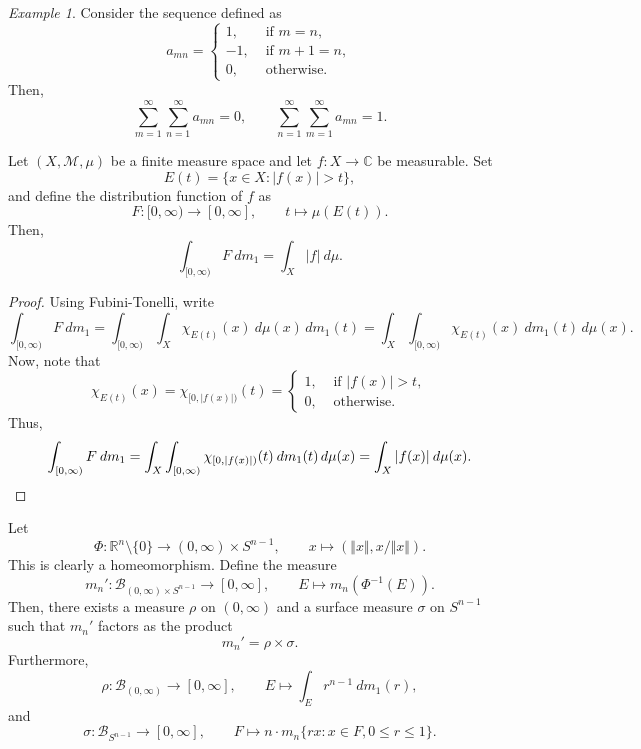 \documentclass[11pt]{article}
\newcommand{\C}{\mathbb{C}}
\newcommand{\R}{\mathbb{R}}
\newcommand{\M}{\mathcal{M}}
\newcommand{\norm}[1]{\Vert #1 \Vert}
\theoremstyle{definition}
\theoremstyle{remark}
\newtheorem*{example}{Example}
\numberwithin{equation}{section}
\begin{document}
    \begin{example}
        Consider the sequence defined as \[
            a_{mn} = \begin{cases}
                1, &\text{ if } m = n, \\
                -1, &\text{ if } m + 1 = n, \\
                0, &\text{ otherwise}.
            \end{cases}
        \] Then, \[
            \sum_{m = 1}^\infty\sum_{n = 1}^\infty a_{mn} = 0, \qquad
            \sum_{n = 1}^\infty\sum_{m = 1}^\infty a_{mn} = 1.
        \] 
    \end{example}


    \begin{theorem}
        Let $(X, \M, \mu)$ be a finite measure space and let $f\colon X \to \C$ be
        measurable. Set \[
            E(t) = \{x \in X: |f(x)| > t\},
        \] and define the distribution function of $f$ as \[
            F\colon [0, \infty) \to [0, \infty], \qquad t \mapsto \mu(E(t)).
        \] Then, \[
            \int_{[0, \infty)} F\:dm_1 = \int_X |f|\:d\mu.
        \] 
    \end{theorem}
    \begin{proof}
        Using Fubini-Tonelli, write \[
            \int_{[0, \infty)} F\:dm_1 = \int_{[0, \infty)} \int_X
            \chi_{E(t)}(x)\:d\mu(x)\,dm_1(t) = \int_X \int_{[0, \infty)}
            \chi_{E(t)}(x)\:dm_1(t)\,d\mu(x).
        \] Now, note that \[
            \chi_{E(t)}(x) = \chi_{[0, |f(x)|)}(t) = \begin{cases}
                1, &\text{ if } |f(x)| > t, \\
                0, &\text{ otherwise}.
            \end{cases}
        \] Thus, \[
            \int_{[0, \infty)} F\:dm_1 = \int_{X}\int_{[0, \infty)} \chi_{[0,
            |f(x)|)}(t) \:dm_1(t)\,d\mu(x) = \int_X |f(x)|\:d\mu(x). \qedhere
        \] 
    \end{proof}

    \begin{theorem}
        Let \[
            \Phi\colon \R^n\setminus\{0\} \to (0, \infty) \times S^{n - 1}, \qquad
            x \mapsto (\norm{x}, x / \norm{x}).
        \] This is clearly a homeomorphism. Define the measure \[
            m_n'\colon \mathcal{B}_{(0, \infty) \times S^{n - 1}} \to [0, \infty],
            \qquad E \mapsto m_n(\Phi^{-1}(E)).
        \] Then, there exists a measure $\rho$ on $(0, \infty)$ and a surface measure
        $\sigma$ on $S^{n - 1}$ such that $m_n'$ factors as the product \[
            m_n' = \rho \times \sigma.
        \] Furthermore, \[
            \rho\colon \mathcal{B}_{(0, \infty)}\to [0, \infty], \qquad
            E \mapsto \int_E r^{n - 1}\:dm_1(r),
        \] and \[
            \sigma\colon \mathcal{B}_{S^{n - 1}}\to [0, \infty], \qquad
            F \mapsto n\cdot m_n\{rx: x \in F, 0 \leq r \leq 1\}.
        \] 
    \end{theorem}
\end{document}

